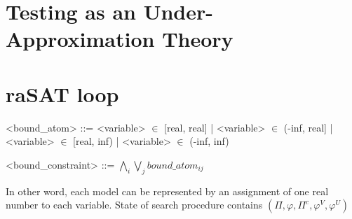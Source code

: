 \section{Testing as an Under-Approximation Theory}


\section{raSAT loop}
\begin{grammar}
<bound\_atom> ::= <variable> $\in$ [real, real] | <variable> $\in$ (-inf, real] | <variable> $\in$ [real, inf) | <variable> $\in$ (-inf, inf)


<bound\_constraint> ::= $\bigwedge\limits_i\bigvee\limits_jbound\_atom_{ij}$
\end{grammar}
In other word, each model can be represented by an assignment of one real number to each variable. 
State of search procedure contains  $(\Pi, \varphi, \Pi^c, \varphi^V, \varphi^U)$


